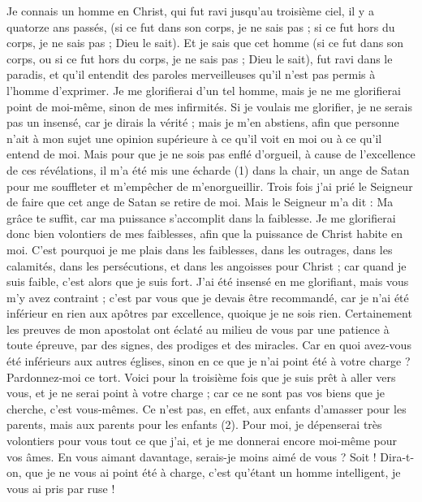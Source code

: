 \begin{multicols}{2}
Je connais un homme en Christ, qui fut ravi jusqu’au troisième ciel, il y a quatorze ans passés, (si ce fut dans son corps, je ne sais pas ; si ce fut hors du corps, je ne sais pas ; Dieu le sait).
Et je sais que cet homme (si ce fut dans son corps, ou si ce fut hors du corps, je ne sais pas ; Dieu le sait),
fut ravi dans le paradis, et qu’il entendit des paroles merveilleuses qu'il n'est pas permis à l'homme d’exprimer.
Je me glorifierai d'un tel homme, mais je ne me glorifierai point de moi-même, sinon de mes infirmités.
Si je voulais me glorifier, je ne serais pas un insensé, car je dirais la vérité ; mais je m'en abstiens, afin que personne n’ait à mon sujet une opinion supérieure à ce qu’il voit en moi ou à ce qu’il entend de moi.
Mais pour que je ne sois pas enflé d’orgueil, à cause de l'excellence de ces révélations, il m'a été mis une écharde (1) dans la chair, un ange de Satan pour me souffleter et m’empêcher de m’enorgueillir.
Trois fois j'ai prié le Seigneur de faire que cet ange de Satan se retire de moi.
Mais le Seigneur m'a dit : Ma grâce te suffit, car ma puissance s’accomplit dans la faiblesse. Je me glorifierai donc bien volontiers de mes faiblesses, afin que la puissance de Christ habite en moi.
C’est pourquoi je me plais dans les faiblesses, dans les outrages, dans les calamités, dans les persécutions, et dans les angoisses pour Christ ; car quand je suis faible, c'est alors que je suis fort.
J'ai été insensé en me glorifiant, mais vous m'y avez contraint ; c’est par vous que je devais être recommandé, car je n'ai été inférieur en rien aux apôtres par excellence, quoique je ne sois rien.
Certainement les preuves de mon apostolat ont éclaté au milieu de vous par une patience à toute épreuve, par des signes, des prodiges et des miracles.
Car en quoi avez-vous été inférieurs aux autres églises, sinon en ce que je n’ai point été à votre charge ? Pardonnez-moi ce tort.
Voici pour la troisième fois que je suis prêt à aller vers vous, et je ne serai point à votre charge ; car ce ne sont pas vos biens que je cherche, c’est vous-mêmes. Ce n’est pas, en effet, aux enfants d’amasser pour les parents, mais aux parents pour les enfants (2).
Pour moi, je dépenserai très volontiers pour vous tout ce que j’ai, et je me donnerai encore moi-même pour vos âmes. En vous aimant davantage, serais-je moins aimé de vous ?
Soit ! Dira-t-on, que je ne vous ai point été à charge, c'est qu'étant un homme intelligent, je vous ai pris par ruse !

\end{multicols}
